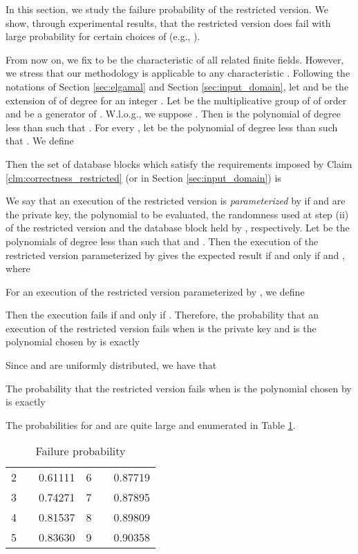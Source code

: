 \documentclass[JMC]{degruyter-journal}
\begin{document}
In this section, we  study the
failure  probability of the restricted version. We show,
through  experimental results,  that the restricted version  does fail with large
probability for certain choices of  (e.g.,  ).


From now on, we fix  to be the characteristic of all related
finite fields. However, we stress that our methodology is applicable
to any characteristic
 .
Following the notations of Section \ref{sec:elgamal} and Section 
\ref{sec:input_domain}, let   and
 be the extension of  of degree  for an integer  .
  Let  be the multiplicative group
of  of order  and  be a generator of .
W.l.o.g., we suppose . Then  is the
polynomial of degree less than  such that .
 For every , let  be the polynomial of degree less than  such that
  .
We define

Then the set of database blocks which satisfy the requirements
imposed by Claim \ref{clm:correctness_restricted} (or in Section
\ref{sec:input_domain})  is


We say that an execution of the restricted version  is {\em parameterized} by
 if  and  are the private
key, the polynomial to be evaluated,  the randomness used at step (ii) of the restricted version 
and  the database block held by ,  respectively.
 Let  be the polynomials of degree less than 
such that  and . Then  the
execution of the restricted version  parameterized by  gives
 the expected result {if and only if}  and
, where

For an  execution of  the restricted version   parameterized by
,  we define

Then the execution  fails if and only if . Therefore, the probability that an execution of the restricted version
fails when  is the private key and    is the polynomial
 chosen by  is exactly

Since  and  are uniformly distributed, we have that

The probability that the restricted version   fails when  is the
polynomial
 chosen by 
is exactly


The   probabilities  for  and 
are quite large and  enumerated in Table \ref{table:failprob}.
\begin{table}[ghp]
\begin{center}
\begin{tabular}{|c|c|c||c|c|c|}\hline
 &    &   &  &    & 
\\ \hline \hline
2 &     &0.61111    & 6 &           & 0.87719         \\ \hline
3 &     & 0.74271   & 7 &                         & 0.87895   \\ \hline
4 &     & 0.81537   & 8 &       & 0.89809           \\ \hline
5 &   & 0.83630   & 9 &                     & 0.90358     \\ \hline
\end{tabular}
\end{center}
\caption{Failure probability}
\label{table:failprob}
\end{table}
\end{document}
